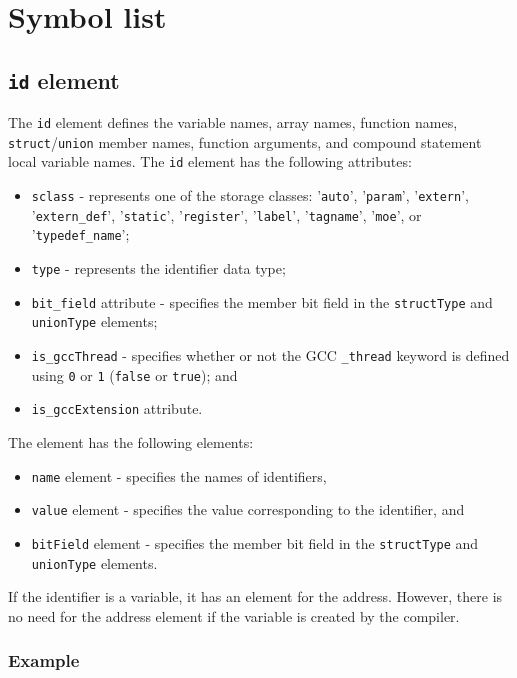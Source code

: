 \section{Symbol list}

\subsection{ {\tt id} element}

The {\tt id} element defines the variable names, array names, function names, {\tt struct}/{\tt union} member names, function arguments, and compound statement local variable names. The {\tt id} element has the following attributes:

\begin{itemize}
\item {\tt sclass} - represents one of the storage classes: '{\tt auto}', '{\tt param}', '{\tt extern}', '{\tt extern\_def}', '{\tt static}', '{\tt register}', '{\tt label}', '{\tt tagname}', '{\tt moe}', or '{\tt typedef\_name}';
\item {\tt type} - represents the identifier data type;
\item {\tt bit\_field} attribute - specifies the member bit field in the {\tt structType} and {\tt unionType} elements;
\item {\tt is\_gccThread} - specifies whether or not the GCC {\tt \_thread} keyword is defined using {\tt 0} or {\tt 1} ({\tt false} or {\tt true}); and
\item {\tt is\_gccExtension} attribute.
\end{itemize}

The element has the following elements:

\begin{itemize}
\item {\tt name} element - specifies the names of identifiers,
\item {\tt value} element - specifies the value corresponding to the identifier, and
\item {\tt bitField} element - specifies the member bit field in the {\tt structType} and {\tt unionType} elements.
\end{itemize}

If the identifier is a variable, it has an element for the address. However, there is no need for the address element if the variable is created by the compiler.

\subsubsection*{Example}

